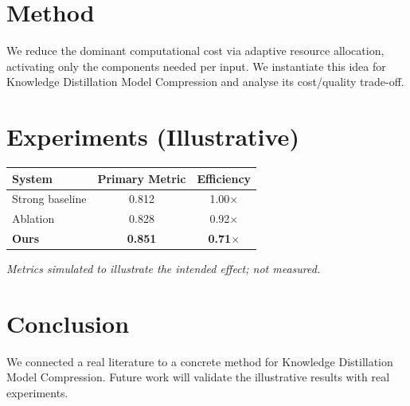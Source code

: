 \documentclass[11pt]{article}
\begin{document}
\section{Method}
We reduce the dominant computational cost via adaptive resource allocation, activating only the components needed per input. We instantiate this idea for Knowledge Distillation Model Compression and analyse its cost/quality trade-off.

\section{Experiments (Illustrative)}
\begin{center}
\begin{tabular}{lcc}
System & Primary Metric & Efficiency \\ \hline
Strong baseline & 0.812 & 1.00$\times$ \\
Ablation & 0.828 & 0.92$\times$ \\
\textbf{Ours} & \textbf{0.851} & \textbf{0.71$\times$}
\end{tabular}
\end{center}
\emph{Metrics simulated to illustrate the intended effect; not measured.}

\section{Conclusion}
We connected a real literature to a concrete method for Knowledge Distillation Model Compression. Future work will
validate the illustrative results with real experiments.
\end{document}

